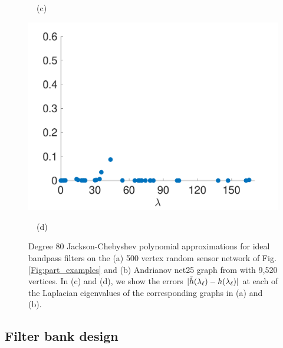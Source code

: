 \documentclass[journal, 10pt]{IEEEtran}
\begin{document}
\begin{figure}[tb]
\begin{minipage}[m]{0.49\linewidth}
\centerline{~~\small{(c)}}
\end{minipage}
\begin{minipage}[m]{0.49\linewidth}
\centerline{\includegraphics[width=.9\linewidth]{fig_approx_filter_net25_error}}
\centerline{~~\small{(d)}}
\end{minipage}
\caption{Degree 80 Jackson-Chebyshev polynomial approximations for ideal bandpass filters on the (a) 500 vertex random sensor network of Fig. \ref{Fig:part_examples} and (b) Andrianov net25 graph from \cite{davis2011university} with 9,520 vertices. In (c) and (d), we show the errors $|\tilde{h}(\lambda_{\ell})-h(\lambda_{\ell})|$ at each of the Laplacian eigenvalues of the corresponding graphs in (a) and (b). \vspace{-.2in}}
\label{Fig:approx_filtering_error}
\end{figure}


\subsection{Filter bank design}
\end{document}
